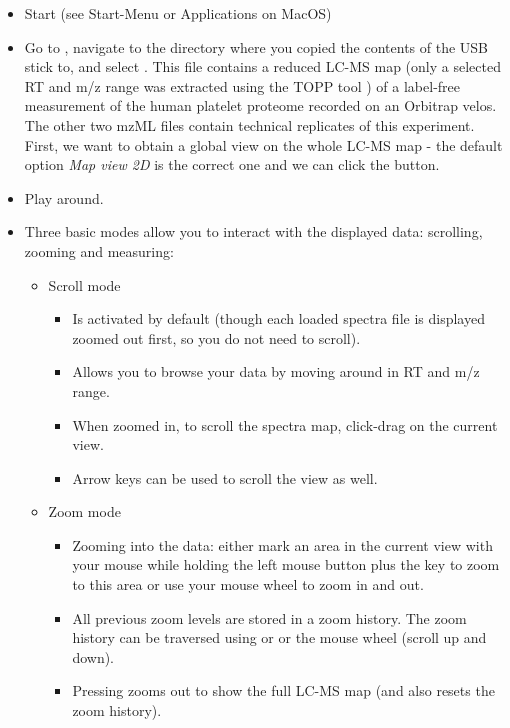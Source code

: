 \begin{itemize}
\item Start  (see Start-Menu or Applications on MacOS)
\item Go to , navigate to the directory where you copied the contents of the USB stick to,
      and select
      . This file contains a reduced LC-MS map (only a selected RT and m/z range
      was extracted using the TOPP tool ) of a label-free measurement of the human platelet proteome recorded on an Orbitrap velos.
      The other two mzML files contain technical replicates of this experiment.
      First, we want to obtain a global view on the whole LC-MS map - the default option \textit{Map view 2D} is the correct one and we can click the  button. 
\item Play around.
\item Three basic modes allow you to interact with the displayed data: scrolling, zooming and measuring:
    \begin{itemize}
    \item Scroll mode
        \begin{itemize}
        \item Is activated by default (though each loaded spectra file is displayed zoomed out first, so you do not need to scroll).
        \item Allows you to browse your data by moving around in RT and m/z range.
        \item When zoomed in, to scroll the spectra map, click-drag on the current view.
        \item Arrow keys can be used to scroll the view as well.
        \end{itemize}
    \item Zoom mode
        \begin{itemize}
        \item Zooming into the data: either mark an area in the current view with your mouse while holding the left mouse
              button plus the \keys{\ctrl} key to zoom to this area
              or use your mouse wheel to zoom in and out.
        \item All previous zoom levels are stored in a zoom history. The zoom history can be traversed using
              \keys[,]{\ctrl,+} or \keys[,]{\ctrl,-} or the mouse wheel (scroll up and down).
        \item Pressing  zooms out to show the full LC-MS map (and also resets the zoom history).

\end{itemize}
\end{itemize}
\end{itemize}

